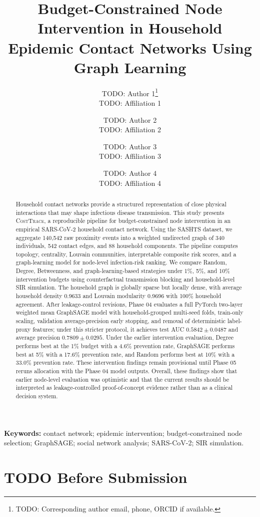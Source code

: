 \documentclass[11pt,a4paper]{article}
\title{Budget-Constrained Node Intervention in Household Epidemic Contact Networks Using Graph Learning}
\author{
  TODO: Author 1\thanks{TODO: Corresponding author email, phone, ORCID if available.}\\
  TODO: Affiliation 1
  \and
  TODO: Author 2\\
  TODO: Affiliation 2
  \and
  TODO: Author 3\\
  TODO: Affiliation 3
  \and
  TODO: Author 4\\
  TODO: Affiliation 4
}
\date{}
\newcommand{\costtrace}{\textsc{CostTrace}}
\begin{document}
\maketitle

\begin{abstract}
Household contact networks provide a structured representation of close physical interactions that may shape infectious disease transmission. This study presents \costtrace, a reproducible pipeline for budget-constrained node intervention in an empirical SARS-CoV-2 household contact network. Using the SASHTS dataset, we aggregate 140,542 raw proximity events into a weighted undirected graph of 340 individuals, 542 contact edges, and 88 household components. The pipeline computes topology, centrality, Louvain communities, interpretable composite risk scores, and a graph-learning model for node-level infection-risk ranking. We compare Random, Degree, Betweenness, and graph-learning-based strategies under 1\%, 5\%, and 10\% intervention budgets using counterfactual transmission blocking and household-level SIR simulation. The household graph is globally sparse but locally dense, with average household density 0.9633 and Louvain modularity 0.9696 with 100\% household agreement. After leakage-control revisions, Phase 04 evaluates a full PyTorch two-layer weighted mean GraphSAGE model with household-grouped multi-seed folds, train-only scaling, validation average-precision early stopping, and removal of deterministic label-proxy features; under this stricter protocol, it achieves test AUC \(0.5842 \pm 0.0487\) and average precision \(0.7809 \pm 0.0295\). Under the earlier intervention evaluation, Degree performs best at the 1\% budget with a 4.6\% prevention rate, GraphSAGE performs best at 5\% with a 17.6\% prevention rate, and Random performs best at 10\% with a 33.0\% prevention rate. These intervention findings remain provisional until Phase 05 reruns allocation with the Phase 04 model outputs. Overall, these findings show that earlier node-level evaluation was optimistic and that the current results should be interpreted as leakage-controlled proof-of-concept evidence rather than as a clinical decision system.
\end{abstract}

\noindent\textbf{Keywords:} contact network; epidemic intervention; budget-constrained node selection; GraphSAGE; social network analysis; SARS-CoV-2; SIR simulation.

\section*{TODO Before Submission}
\end{document}
